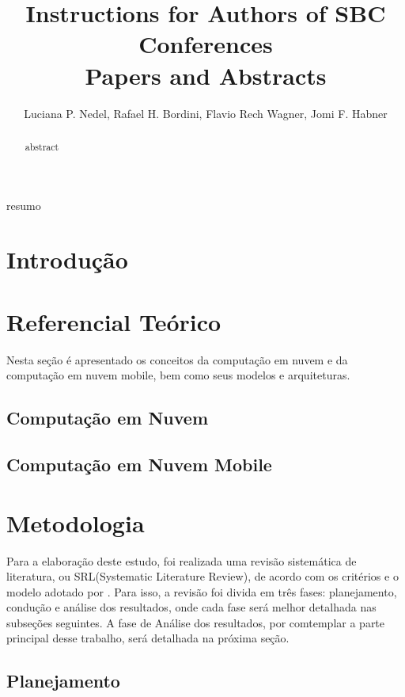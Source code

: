 \documentclass[12pt]{article}
\title{Instructions for Authors of SBC Conferences\\ Papers and Abstracts}
\author{Luciana P. Nedel\inst{1}, Rafael H. Bordini\inst{2}, Flavio Rech
  Wagner\inst{1}, Jomi F. Habner\inst{3} }
\begin{document}
 

\maketitle

\begin{abstract}
  abstract
\end{abstract}

\begin{resumo} 
  resumo
\end{resumo}


\section{Introdução}

\lipsum[1]

\section{Referencial Teórico}

Nesta seção é apresentado os conceitos da computação em nuvem e da computação em nuvem
mobile, bem como seus modelos e arquiteturas.

\subsection{Computação em Nuvem}

\subsection{Computação em Nuvem Mobile}

\section{Metodologia}

Para a elaboração deste estudo, foi realizada uma revisão sistemática de literatura,
ou SRL(Systematic Literature Review), de acordo com os critérios e o modelo adotado 
por \cite{kitchenham2012}. Para isso, a revisão foi divida em três fases: planejamento,
condução e análise dos resultados, onde cada fase será melhor detalhada nas subseções seguintes.
A fase de Análise dos resultados, por comtemplar a parte principal desse trabalho, será detalhada
na próxima seção.

\subsection{Planejamento}
\end{document}
